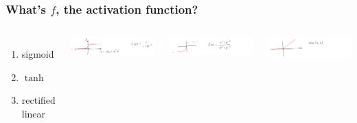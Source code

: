 \documentclass[mathserif, aspectratio=169]{beamer}
\begin{document}
\begin{frame}[t]\frametitle{What's $f$, the activation function?}
    \begin{columns}
	    \begin{enumerate}
	    	\item sigmoid
	    	\vspace{15mm}
	    	\item $\tanh$
	    	\vspace{15mm}
	       	\item rectified linear
	    \end{enumerate}
	    \pause
        \includegraphics[width = 1\textwidth]{sigmoid.pdf}

    	\includegraphics[width = 1\textwidth]{tanh.pdf}

		\includegraphics[width = 1\textwidth]{rectilinear.pdf}

    \end{columns}
\end{frame}
\end{document}
